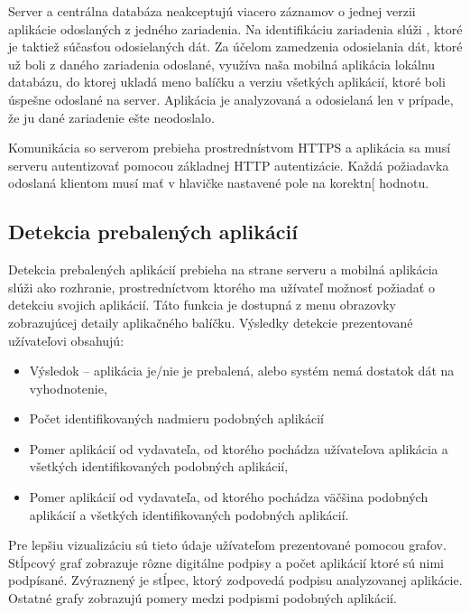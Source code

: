 Server a centrálna databáza neakceptujú viacero záznamov o jednej verzii aplikácie odoslaných z jedného zariadenia. Na identifikáciu zariadenia slúži , ktoré je taktiež súčasťou odosielaných dát. Za účelom zamedzenia odosielania dát, ktoré už boli z daného zariadenia odoslané, využíva naša mobilná aplikácia lokálnu databázu, do ktorej ukladá meno balíčku a verziu všetkých aplikácií, ktoré boli úspešne odoslané na server. Aplikácia je analyzovaná a odosielaná len v prípade, že ju dané zariadenie ešte neodoslalo.

Komunikácia so serverom prebieha prostrednístvom HTTPS a aplikácia sa musí serveru autentizovať pomocou základnej HTTP autentizácie. Každá požiadavka odoslaná klientom musí mať v hlavičke nastavené pole  na korektn[ hodnotu.

\subsection{Detekcia prebalených aplikácií}
Detekcia prebalených aplikácií prebieha na strane serveru a mobilná aplikácia slúži ako rozhranie, prostredníctvom ktorého ma užívateľ možnosť požiadať o detekciu svojich aplikácií. Táto funkcia je dostupná z menu obrazovky zobrazujúcej detaily aplikačného balíčku. Výsledky detekcie prezentované užívateľovi obsahujú:
\begin{itemize}
	\item Výsledok -- aplikácia je/nie je prebalená, alebo systém nemá dostatok dát na vyhodnotenie,
	\item Počet identifikovaných nadmieru podobných aplikácií
	\item Pomer aplikácií od vydavateľa, od ktorého pochádza užívateľova aplikácia a všetkých identifikovaných podobných aplikácií,
	\item Pomer aplikácií od vydavateľa, od ktorého pochádza väčšina podobných aplikácií a všetkých identifikovaných podobných aplikácií.
\end{itemize}

Pre lepšiu vizualizáciu sú tieto údaje užívateľom prezentované pomocou grafov. Stĺpcový graf zobrazuje rôzne digitálne podpisy a počet aplikácií ktoré sú nimi podpísané. Zvýraznený je stĺpec, ktorý zodpovedá podpisu analyzovanej aplikácie. Ostatné grafy zobrazujú pomery medzi podpismi podobných aplikácií.

